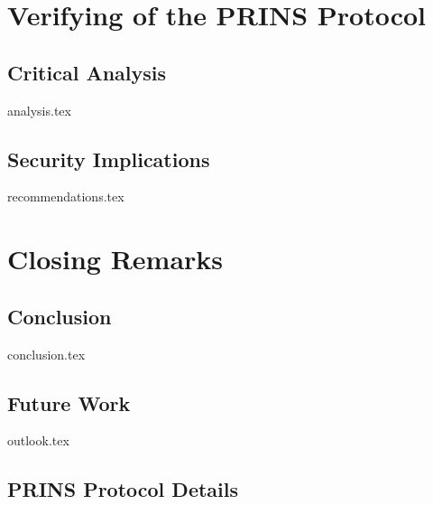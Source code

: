 \documentclass[a4paper,12pt,twoside]{report}
\begin{document}
\clearpage

\chapter{Verifying of the PRINS Protocol}
\label{chap:verification}

\section{Critical Analysis}
\label{sec:analysis}
{analysis.tex}

\section{Security Implications}
\label{sec:implications}
{recommendations.tex}

\clearpage

\chapter{Closing Remarks}
\label{chap:closing}

\section{Conclusion}
\label{sec:conclusion}
{conclusion.tex}

\section{Future Work}
\label{sec:outlook}
{outlook.tex}

\clearpage

\printbibliography[title={Literature},heading=bibintoc,nottype=online]

\printbibliography[title={Online Sources},heading=bibintoc,type=online]

\clearpage

\begin{appendices}

\renewcommand\thefigure{\thechapter.\arabic{figure}}

\chapter{PRINS Protocol Details}



\end{appendices}
\end{document}

